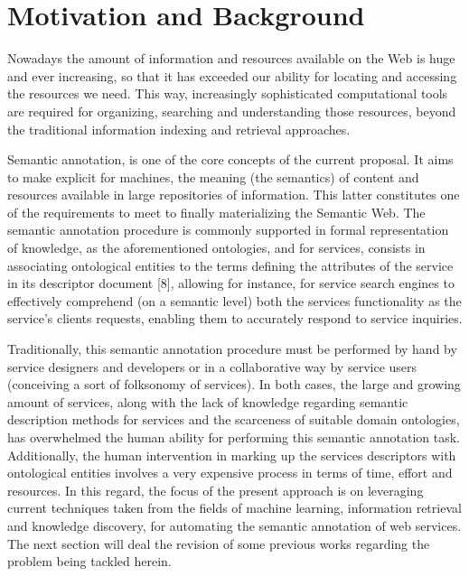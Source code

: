 \section{Motivation and Background}

\noindent Nowadays the amount of information and resources available on the Web is huge and ever increasing, so that it has exceeded our ability for locating and accessing the resources we need. This way, increasingly sophisticated computational tools are required for organizing, searching and understanding those resources, beyond the traditional information indexing and retrieval approaches.

Semantic annotation, is one of the core concepts of the current proposal. It aims to make explicit for machines, the meaning (the semantics) of content and resources available in large repositories of information. This latter constitutes one of the requirements to meet to finally materializing the Semantic Web. The semantic annotation procedure is commonly supported in formal representation of knowledge, as the aforementioned ontologies, and for services, consists in associating ontological entities to the terms defining the attributes of the service in its descriptor document [8], allowing for instance, for service search engines to effectively comprehend (on a semantic level) both the services functionality as the service’s  clients requests, enabling them to accurately respond to service inquiries.

Traditionally, this semantic annotation procedure must be performed by hand by service designers and developers or in a collaborative way by service users (conceiving a sort of folksonomy of services). In both cases, the large and growing amount of services, along with the lack of knowledge regarding semantic description methods for services and the scarceness of suitable domain ontologies, has overwhelmed the human ability for performing this semantic annotation task. Additionally, the human intervention in marking up the services descriptors with ontological entities involves a very expensive process in terms of time, effort and resources. In this regard, the focus of the present approach is on leveraging current techniques taken from the fields of machine learning, information retrieval and knowledge discovery, for automating the semantic annotation of web services. The next section will deal the revision of some previous works regarding the problem being tackled herein.